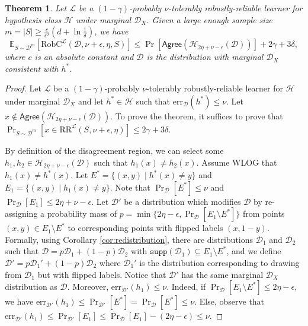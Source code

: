 \documentclass[11pt]{article}
\newcommand{\CR}{\text{RR}}
\newcommand{\err}{\mathrm{err}}
\newtheorem{theorem}{Theorem}[section]
\newcommand{\0}{\mathbf{0}}
\newcommand{\1}{\mathbf{1}}
\newcommand{\cD}{\mathcal{D}}
\newcommand{\cH}{\mathcal{H}}
\newcommand{\cL}{\mathcal{L}}
\newcommand{\bbE}{\mathbb{E}}
\newcommand{\Agree}{\mathsf{Agree}}
\begin{document}
\begin{theorem}
Let $\cL$ be a $(1-\gamma)$-probably $\nu$-tolerably robustly-reliable learner for hypothesis class $\cH$ under marginal $\cD_X$. Given a large enough sample size $m=|S|\ge\frac{c}{\epsilon^2}\left(d+\ln\frac{1}{\delta}\right)$, we have
$$\bbE_{S\sim\cD^m}[\text{RobC}^\cL(\cD,\nu+\epsilon,\eta,S)]\le \Pr[\Agree(\cH_{2\eta+\nu-\epsilon}(\cD))]+2\gamma+3\delta,$$
where $c$ is an absolute constant and $\cD$ is the distribution with marginal $\cD_X$ consistent with $h^*$.
\label{thm:probably_robustly-reliable_lower_bound_distributional_agnostic}
\end{theorem}


\begin{proof}
Let  $\cL$ be a $(1-\gamma)$-probably $\nu$-tolerably robustly-reliable learner for $\cH$ under marginal $\cD_X$ and let $h^*\in\cH$ such that $\err_\cD(h^*)\le\nu$.  Let $x\not\in \Agree(\cH_{2\eta+\nu-\epsilon}(\cD))$. To prove the theorem, it suffices to prove that $\Pr_{S \sim \cD^m}[x \in \CR^\cL(S,\nu+\epsilon,\eta) ] \leq 2\gamma+3\delta$.

By definition of the disagreement region, we can select some $h_1,h_2 \in \cH_{2\eta+\nu-\epsilon}(\cD)$ such that $h_1(x)\neq h_2(x)$. Assume WLOG that $h_1(x)\neq h^*(x)$. Let $E^*=\{(x,y)\mid h^*(x)\ne y\}$ and $E_1=\{(x,y)\mid h_1(x)\ne y\}$. Note that $\Pr_\cD[E^*]\le\nu$ and $\Pr_\cD[E_1]\le2\eta+\nu-\epsilon$. Let $\cD'$ be a distribution which modifies $\cD$ by re-assigning a probability mass of $p=\min\{2\eta-\epsilon,\Pr_\cD[E_1\setminus E^*]\}$ from points $(x,y)\in E_1\setminus E^*$ to corresponding points with flipped labels $(x,1-y)$. Formally, using Corollary \ref{cor:redistribution}, there are distributions $\cD_1$ and $\cD_2$ such that $\cD=p\cD_1+(1-p)\cD_2$ with $\texttt{supp}(\cD_1)\subseteq E_1\setminus E^*$, and we define $\cD'=p\cD_1'+(1-p)\cD_2$ where $\cD_1'$ is the distribution corresponding to drawing from $\cD_1$ but with flipped labels. Notice that $\cD'$ has the same marginal $\cD_X$ distribution as $\cD$. Moreover, $\err_{\cD'}(h_1)\le \nu$. Indeed, if $\Pr_\cD[E_1\setminus E^*]\le 2\eta-\epsilon$, we have $\err_{\cD'}(h_1)\le \Pr_{\cD'}[E^*]=\Pr_{\cD}[E^*]\le \nu$. Else, observe that $\err_{\cD'}(h_1)\le \Pr_{\cD'}[E_1] \le \Pr_\cD[E_1]-(2\eta-\epsilon)\le \nu$.


\end{proof}
\end{document}
